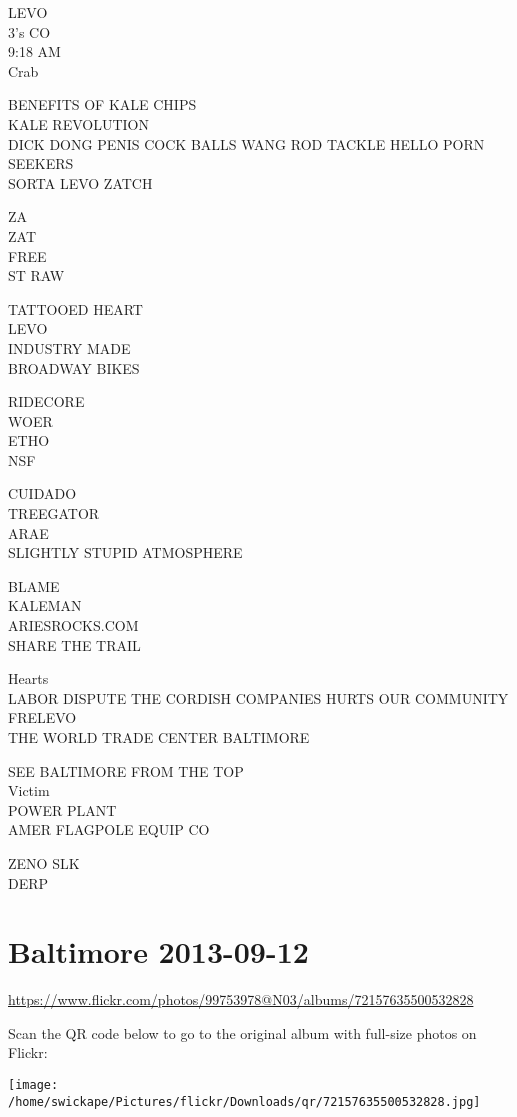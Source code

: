 \documentclass[10pt,letterpaper]{article}
\begin{document}
LEVO\\
3's CO\\
9:18 AM\\
Crab

BENEFITS OF KALE CHIPS\\
KALE REVOLUTION\\
DICK DONG PENIS COCK BALLS WANG ROD TACKLE HELLO PORN SEEKERS\\
SORTA LEVO ZATCH

ZA\\
ZAT\\
FREE\\
ST RAW

TATTOOED HEART\\
LEVO\\
INDUSTRY MADE\\
BROADWAY BIKES

RIDECORE\\
WOER\\
ETHO\\
NSF

CUIDADO\\
TREEGATOR\\
ARAE\\
SLIGHTLY STUPID ATMOSPHERE

BLAME\\
KALEMAN\\
ARIESROCKS.COM\\
SHARE THE TRAIL

Hearts\\
LABOR DISPUTE THE CORDISH COMPANIES HURTS OUR COMMUNITY\\
FRELEVO\\
THE WORLD TRADE CENTER BALTIMORE

SEE BALTIMORE FROM THE TOP\\
Victim\\
POWER PLANT\\
AMER FLAGPOLE EQUIP CO

ZENO SLK\\
DERP


\section*{Baltimore 2013-09-12}

\url{https://www.flickr.com/photos/99753978@N03/albums/72157635500532828}

Scan the QR code below to go to the original album with full-size photos on Flickr:

\texttt{[image: /home/swickape/Pictures/flickr/Downloads/qr/72157635500532828.jpg]}
\end{document}
